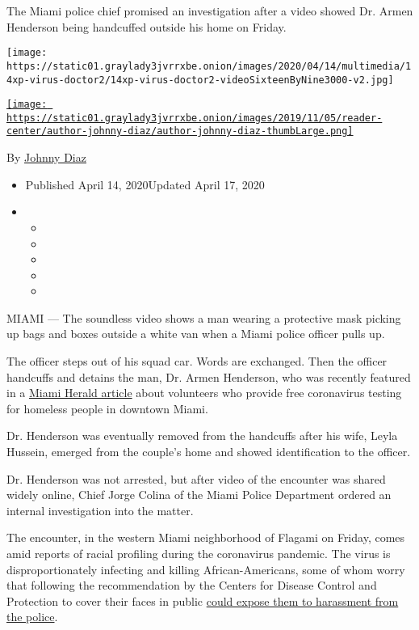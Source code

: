 The Miami police chief promised an investigation after a video showed
Dr. Armen Henderson being handcuffed outside his home on Friday.

\texttt{[image: https://static01.graylady3jvrrxbe.onion/images/2020/04/14/multimedia/14xp-virus-doctor2/14xp-virus-doctor2-videoSixteenByNine3000-v2.jpg]}

\href{https://www.nytimes3xbfgragh.onion/by/johnny-diaz}{\texttt{[image: https://static01.graylady3jvrrxbe.onion/images/2019/11/05/reader-center/author-johnny-diaz/author-johnny-diaz-thumbLarge.png]}}

By \href{https://www.nytimes3xbfgragh.onion/by/johnny-diaz}{Johnny Diaz}

\begin{itemize}
\item
  Published April 14, 2020Updated April 17, 2020
\item
  \begin{itemize}
  \item
  \item
  \item
  \item
  \item
  \end{itemize}
\end{itemize}

MIAMI --- The soundless video shows a man wearing a protective mask
picking up bags and boxes outside a white van when a Miami police
officer pulls up.

The officer steps out of his squad car. Words are exchanged. Then the
officer handcuffs and detains the man, Dr. Armen Henderson, who was
recently featured in a
\href{https://www.miamiherald.com/news/coronavirus/article241554991.html}{Miami
Herald article} about volunteers who provide free coronavirus testing
for homeless people in downtown Miami.

Dr. Henderson was eventually removed from the handcuffs after his wife,
Leyla Hussein, emerged from the couple's home and showed identification
to the officer.

Dr. Henderson was not arrested, but after video of the encounter was
shared widely online, Chief Jorge Colina of the Miami Police Department
ordered an internal investigation into the matter.

The encounter, in the western Miami neighborhood of Flagami on Friday,
comes amid reports of racial profiling during the coronavirus pandemic.
The virus is disproportionately infecting and killing African-Americans,
some of whom worry that following the recommendation by the Centers for
Disease Control and Protection to cover their faces in public
\href{https://www.nytimes3xbfgragh.onion/2020/04/14/us/coronavirus-masks-racism-african-americans.html}{could
expose them to harassment from the police}.

